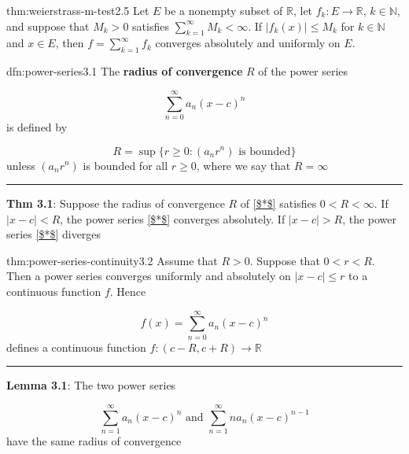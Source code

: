 \documentclass[landscape, 8pt]{extarticle}
\begin{document}
\begin{multicols}{3}
\begin{thm}{thm:weierstrass-m-test}{2.5}
	Let $E$ be a nonempty subset of $\mathbb{R}$, let $f_{k}: E\to \mathbb{R},\,k\in\mathbb{N}$, and suppose that $M_{k}>0$ satisfies $\displaystyle\sum_{k=1}^{\infty} M_{k}<\infty$. If $\lvert f_{k}(x) \rvert \le M_{k}$ for $k\in \mathbb{N}$ and $x\in E$,  then $f=\displaystyle\sum_{k=1}^{\infty}f_{k}$ converges absolutely and uniformly on $E$.
\end{thm}

\vspace{-5pt}
\begin{dfn}{dfn:power-series}{3.1}
	The \textbf{radius of convergence} $R$ of the power series

	\vspace{-5pt}
	\begin{equation}
		\sum_{n=0}^{\infty} a_{n}(x-c)^{n}\tag{$*$}\label{$*$}
	\end{equation}
	is defined by

	\vspace{-5pt}
	\[R=\sup\{r\ge 0:(a_{n}r^n) \text{ is bounded}\}\]
	unless $(a_{n}r^{n})$ is bounded for all $r\ge 0$, where we say that $R=\infty$

	\noindent\rule{\textwidth}{0.2pt}

	\textbf{Thm 3.1}: Suppose the radius of convergence $R$ of \ref{$*$} satisfies $0<R<\infty$. If $\lvert x-c \rvert<R$, the power series \ref{$*$} converges absolutely. If $\lvert x-c \rvert>R$, the power series \ref{$*$} diverges
\end{dfn}

\vspace{-5pt}
\begin{thm}{thm:power-series-continuity}{3.2}
	Assume that $R>0$. Suppose that $0<r<R$. Then a power series converges uniformly and absolutely on $\lvert x-c \rvert\le r$ to a continuous function $f$. Hence

	\vspace{-5pt}
	\[f(x)=\sum_{n=0}^{\infty} a_{n}(x-c)^{n}\]
	defines a continuous function $f:(c-R,c+R)\to \mathbb{R}$

	\noindent\rule{\textwidth}{0.2pt}
	\textbf{Lemma 3.1}: The two power series

	\vspace{-5pt}
	\[\sum_{n=1}^{\infty} a_{n}(x-c)^{n}\text{ and } \sum_{n=1}^{\infty} na_{n}(x-c)^{n-1}\]
	have the same radius of convergence
\end{thm}


\end{multicols}
\end{document}
